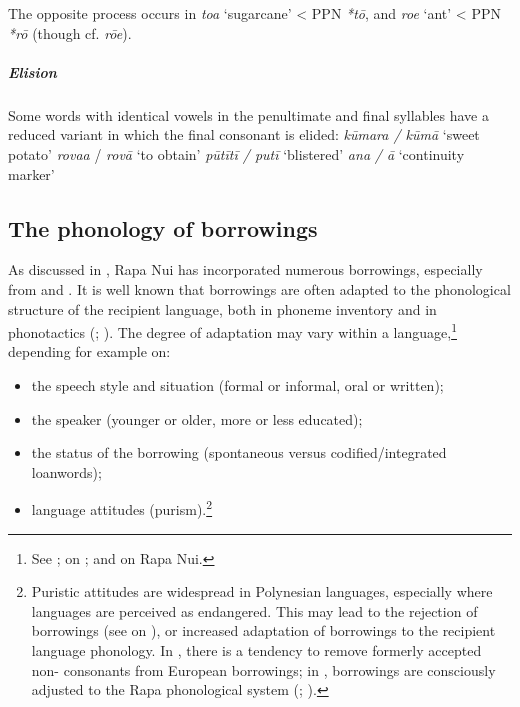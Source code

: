 The opposite process occurs in \textit{toa} ‘sugarcane’ {\textless} PPN \textit{*tō}, and \textit{roe} ‘ant’ {\textless} PPN \textit{*rō} (though cf.  \textit{rōe}).

\subparagraph{Elision} Some words with identical vowels in the penultimate and final syllables have a reduced variant in which the final consonant is elided: 
\ea
\ea
\textit{kūmara / kūmā} ‘sweet potato’
\ex
\textit{rova{\ꞌ}a} / \textit{rovā} ‘to obtain’
\ex
\textit{pūtītī / putī} ‘blistered’
\ex
\textit{{\ꞌ}ana} \textit{/ {\ꞌ}ā} ‘continuity marker’
\z
\z

\subsection{The phonology of borrowings}\label{sec:2.5.3}
As discussed in , Rapa Nui has incorporated numerous borrowings, especially from  and . It is well known that borrowings are often adapted to the phonological structure of the recipient language, both in phoneme inventory and in phonotactics (\citealt{TentGeraghty2004}; \citealt{MatrasSakel2007}). The degree of adaptation may vary within a language,\footnote{\label{fn:68}See \citet[17]{Sakel2007}; \citet{Mosel2004} on ; \citet{Fischer2007} and \citet{Makihara2001Adaptation} on Rapa Nui.} depending for example on:

\begin{itemize}
\item 
the speech style and situation (formal or informal, oral or written);

\item 
the speaker (younger or older, more or less educated);

\item 
the status of the borrowing (spontaneous versus codified/integrated loanwords);

\item 
language attitudes (purism).\footnote{\label{fn:69}Puristic attitudes are widespread in Polynesian languages, especially where languages are perceived as endangered. This may lead to the rejection of borrowings (see \citealt[154]{Harlow2004} on ), or increased adaptation of borrowings to the recipient language phonology. In , there is a tendency to remove formerly accepted non- consonants from European borrowings; in ,  borrowings are consciously adjusted to the Rapa phonological system (\citealt{KievietKieviet2006}; \citealt{Walworth2015Thesis}).}

\end{itemize}

